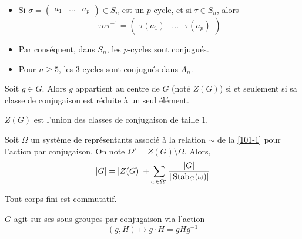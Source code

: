 	\begin{example}
		\begin{itemize}
			\item Si $\sigma = \begin{pmatrix} a_1 & \dots & a_p \end{pmatrix} \in S_n$ est un $p$-cycle, et si $\tau \in S_n$, alors
			\[ \tau \sigma \tau^{-1} = \begin{pmatrix} \tau(a_1) & \dots & \tau(a_p) \end{pmatrix} \]
			\item Par conséquent, dans $S_n$, les $p$-cycles sont conjugués.
			\item Pour $n \geq 5$, les $3$-cycles sont conjugués dans $A_n$.
		\end{itemize}
	\end{example}


	\begin{proposition}
		Soit $g \in G$. Alors $g$ appartient au centre de $G$ (noté $Z(G)$) si et seulement si sa classe de conjugaison est réduite à un seul élément.
	\end{proposition}

	\begin{corollary}
		$Z(G)$ est l'union des classes de conjugaison de taille $1$.
	\end{corollary}


	\begin{proposition}
		Soit $\Omega$ un système de représentants associé à la relation $\sim$ de la \cref{101-1} pour l'action par conjugaison. On note $\Omega' = Z(G) \setminus \Omega$. Alors,
		\[ |G| = |Z(G)| + \sum_{\omega \in \Omega'} \frac{|G|}{|\operatorname{Stab}_G(\omega)|} \]
	\end{proposition}


	\begin{application}
		Tout corps fini est commutatif.
	\end{application}


	\begin{proposition}
		\label{101-2}
		$G$ agit sur ses sous-groupes par conjugaison via l'action
		\[ (g, H) \mapsto g \cdot H = gHg^{-1} \]
	\end{proposition}

